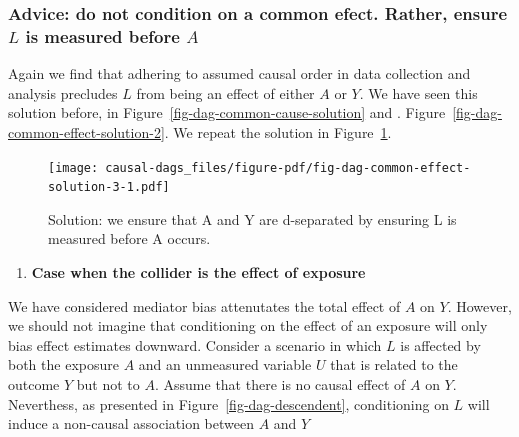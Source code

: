 \documentclass[
  singlecolumn,
  9pt]{article}
\providecommand{\tightlist}{%
  \setlength{\itemsep}{0pt}\setlength{\parskip}{0pt}}\usepackage{longtable,booktabs,array}
\begin{document}
\subsubsection{\texorpdfstring{Advice: do not condition on a common
efect. Rather, ensure \(L\) is measured before
\(A\)}{Advice: do not condition on a common efect. Rather, ensure L is measured before A}}\label{advice-do-not-condition-on-a-common-efect.-rather-ensure-l-is-measured-before-a}

Again we find that adhering to assumed causal order in data collection
and analysis precludes \(L\) from being an effect of either \(A\) or
\(Y\). We have seen this solution before, in
Figure~\ref{fig-dag-common-cause-solution} and .
Figure~\ref{fig-dag-common-effect-solution-2}. We repeat the solution in
Figure~\ref{fig-dag-common-effect-solution-3}.

\begin{figure}

{\centering \texttt{[image: causal-dags\_files/figure-pdf/fig-dag-common-effect-solution-3-1.pdf]}

}

\caption{\label{fig-dag-common-effect-solution-3}Solution: we ensure
that A and Y are d-separated by ensuring L is measured before A occurs.}

\end{figure}

\begin{enumerate}
\def\labelenumi{\arabic{enumi}.}
\setcounter{enumi}{1}
\tightlist
\item
  \textbf{Case when the collider is the effect of exposure}
\end{enumerate}

We have considered mediator bias attenutates the total effect of \(A\)
on \(Y\). However, we should not imagine that conditioning on the effect
of an exposure will only bias effect estimates downward. Consider a
scenario in which \(L\) is affected by both the exposure \(A\) and an
unmeasured variable \(U\) that is related to the outcome \(Y\) but not
to \(A\). Assume that there is no causal effect of \(A\) on \(Y\).
Neverthess, as presented in Figure~\ref{fig-dag-descendent},
conditioning on \(L\) will induce a non-causal association between \(A\)
and \(Y\)
\end{document}
